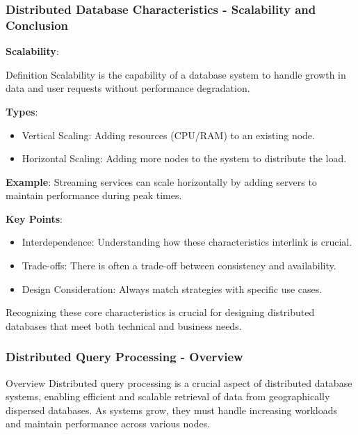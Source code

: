 \documentclass[aspectratio=169]{beamer}
\begin{document}
\begin{frame}[fragile]
  \frametitle{Distributed Database Characteristics - Scalability and Conclusion}
  \textbf{Scalability}:
  \begin{block}{Definition}
    Scalability is the capability of a database system to handle growth in data and user requests without performance degradation.
  \end{block}

  \textbf{Types}:
  \begin{itemize}
    \item Vertical Scaling: Adding resources (CPU/RAM) to an existing node.
    \item Horizontal Scaling: Adding more nodes to the system to distribute the load.
  \end{itemize}

  \textbf{Example}: Streaming services can scale horizontally by adding servers to maintain performance during peak times.

  \vspace{1em} %
  \textbf{Key Points}:
  \begin{itemize}
    \item Interdependence: Understanding how these characteristics interlink is crucial.
    \item Trade-offs: There is often a trade-off between consistency and availability.
    \item Design Consideration: Always match strategies with specific use cases.
  \end{itemize}
  
  Recognizing these core characteristics is crucial for designing distributed databases that meet both technical and business needs.
\end{frame}

\begin{frame}[fragile]
    \frametitle{Distributed Query Processing - Overview}
    \begin{block}{Overview}
        Distributed query processing is a crucial aspect of distributed database systems, enabling efficient and scalable retrieval of data from geographically dispersed databases. As systems grow, they must handle increasing workloads and maintain performance across various nodes.
    \end{block}
\end{frame}
\end{document}

